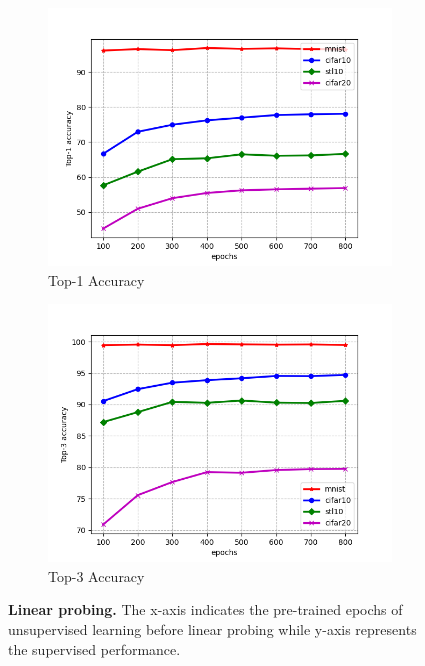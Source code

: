 \documentclass{article}
\begin{document}
\begin{figure}[hbt!]
     \centering
     \begin{subfigure}[b]{.45\textwidth}
         \centering
         \includegraphics[width=\textwidth]{images/linear_probing_top1.png}
         \caption{Top-1 Accuracy}
         \label{fig:top1}
     \end{subfigure}
     \hfill
     \begin{subfigure}[b]{0.45\textwidth}
         \centering
         \includegraphics[width=\textwidth]{images/linear_probing_top3.png}
         \caption{Top-3 Accuracy}
         \label{fig:top3}
     \end{subfigure}
     \caption{\textbf{Linear probing.} The x-axis indicates the pre-trained epochs of unsupervised learning before linear probing while y-axis represents the supervised performance.}
     \label{fig:linear}
\end{figure}
\end{document}
